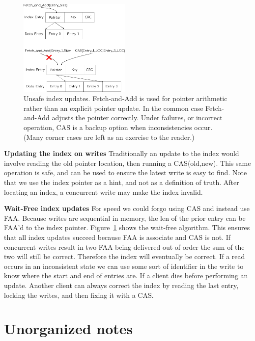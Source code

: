 \begin{figure}[t] \includegraphics[width=0.485\textwidth]{fig/write_updates.pdf}

\caption{ Unsafe index updates. Fetch-and-Add is used for pointer arithmetic
rather than an explicit pointer update. In the common case Fetch-and-Add adjusts
the pointer correctly. Under failures, or incorrect operation, CAS is a backup
option when inconsistencies occur. (Many corner cases are left as an exercise to
the reader.)}

\label{fig:wait_free_update}
\end{figure}

\textbf{Updating the index on writes} Traditionally an update to the index would
involve reading the old pointer location, then running a CAS(old,new). This same
operation is safe, and can be used to ensure the latest write is easy to find.
Note that we use the index pointer as a hint, and not as a definition of truth.
After locating an index, a concurrent write may make the index invalid.

\textbf{Wait-Free index updates} For speed we could forgo using CAS and instead use
FAA. Because writes are sequential in memory, the len of the prior entry can be
FAA'd to the index pointer. Figure~\ref{fig:wait_free_update} shows the wait-free
algorithm. This ensures that all index updates succeed because FAA is associate
and CAS is not. If concurrent writes result in two FAA being delivered out of
order the sum of the two will still be correct. Therefore the index will
eventually be correct. If a read occurs in an inconsistent state we can use some
sort of identifier in the write to know where the start and end of entries are.
If a client dies before performing an update. Another client can always correct
the index by reading the last entry, locking the writes, and then fixing it with
a CAS.


\section{Unorganized notes}

